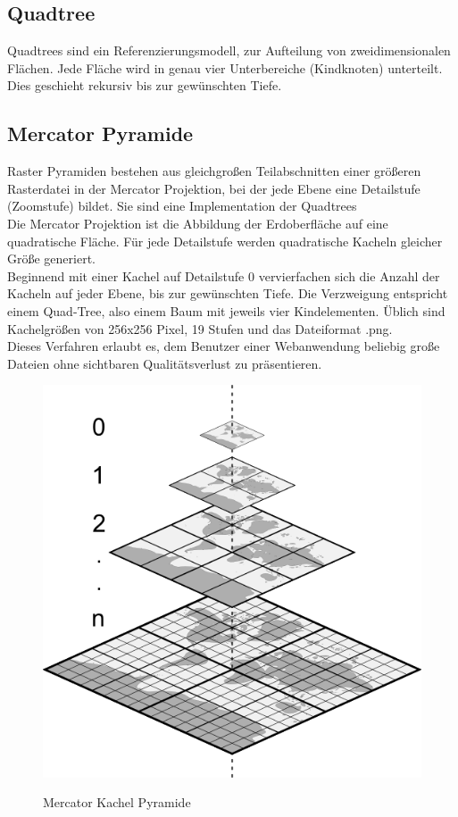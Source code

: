 \documentclass[10pt,conference,compsocconf]{IEEEtran}
\begin{document}
\subsection{Quadtree}
Quadtrees\cite{QuadTrees} sind ein Referenzierungsmodell, zur Aufteilung von zweidimensionalen Flächen. Jede Fläche wird in genau vier Unterbereiche (Kindknoten) unterteilt. Dies geschieht rekursiv bis zur gewünschten Tiefe.


\subsection{Mercator Pyramide}
\label{MercatorPyramide}
Raster Pyramiden bestehen aus gleichgroßen Teilabschnitten einer größeren Rasterdatei in der Mercator Projektion, bei der jede Ebene eine Detailstufe (Zoomstufe) bildet. Sie sind eine Implementation der Quadtrees \\
Die Mercator Projektion ist die Abbildung der Erdoberfläche auf eine quadratische Fläche. Für jede Detailstufe werden quadratische Kacheln gleicher Größe generiert. \\
Beginnend mit einer Kachel auf Detailstufe 0 vervierfachen sich die Anzahl der Kacheln auf jeder Ebene, bis zur gewünschten Tiefe. Die Verzweigung entspricht einem Quad-Tree, also einem Baum mit jeweils vier Kindelementen. Üblich sind Kachelgrößen von 256x256 Pixel, 19 Stufen und das Dateiformat .png. \\
Dieses Verfahren erlaubt es, dem Benutzer einer Webanwendung beliebig große Dateien ohne sichtbaren Qualitätsverlust zu präsentieren.\\
\begin{figure}[H]
	\centering
	\includegraphics[width=0.6\columnwidth]{img/mercator_pyramid.png}\\
	\caption[]{Mercator Kachel Pyramide}
	\label{img:mercator_pyramid}
\end{figure}
\end{document}

